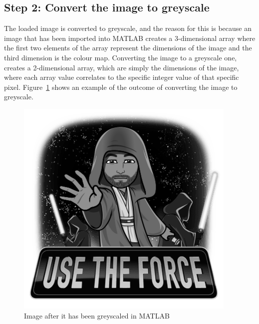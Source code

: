\documentclass[10pt,twocolumn, a4paper]{witseiepaper}
\begin{document}
\subsection{Step 2: Convert the image to greyscale}
\label{sec: Step 2}
The loaded image is converted to greyscale, and the reason for this is because an image that has been imported into MATLAB creates a 3-dimensional array where the first two elements of the array represent the dimensions of the image and the third dimension is the colour map. Converting the image to a greyscale one, creates a 2-dimensional array, which are simply the dimensions of the image, where each array value correlates to the specific integer value of that specific pixel. Figure~\ref{fig: Step 2} shows an example of the outcome of converting the image to greyscale.
\begin{figure}[h!]
\renewcommand{\thefigure}{\arabic{figure}}
\centering
\includegraphics[scale=0.5, frame]{Step2.png}
\caption{Image after it has been greyscaled in MATLAB}
\label{fig: Step 2}
\end{figure}
\end{document}
